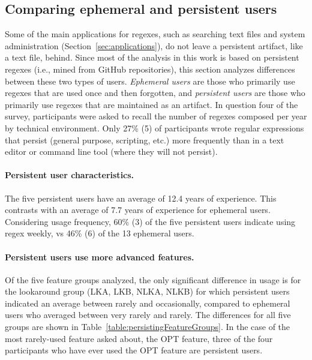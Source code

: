 \subsection{Comparing ephemeral and persistent users}
Some of the main applications for regexes, such as searching text files and system administration (Section~\ref{sec:applications}), do not leave a persistent artifact, like a text file, behind.  Since most of the analysis in this work is based on persistent regexes (i.e., mined from GitHub repositories), this section analyzes differences between these two types of users.  \emph{Ephemeral users} are those who primarily use regexes that are used once and then forgotten, and \emph{persistent users} are those who primarily use regexes that are maintained as an artifact.  In question four of the survey, participants were asked to recall the number of regexes composed per year by technical environment. Only 27\% (5) of participants wrote regular expressions that persist (general purpose, scripting, etc.) more frequently than in a text editor or command line tool (where they will not persist).

\paragraph{Persistent user characteristics.} The five persistent users have an average of 12.4 years of experience.  This contrasts with an average of 7.7 years of experience for ephemeral users.  Considering usage frequency, 60\% (3) of the five persistent users indicate using regex weekly, vs 46\% (6) of the 13 ephemeral users.



\paragraph{Persistent users use more advanced features.} Of the five feature groups analyzed, the only significant difference in usage is for the lookaround group (LKA, LKB, NLKA, NLKB) for which persistent users indicated an average between rarely and occasionally, compared to ephemeral users who averaged between very rarely and rarely.  The differences for all five groups are shown in Table~\ref{table:persistingFeatureGroups}. In the case of the most rarely-used feature asked about, the OPT feature, three of the four participants who have ever used the OPT feature are persistent users.

